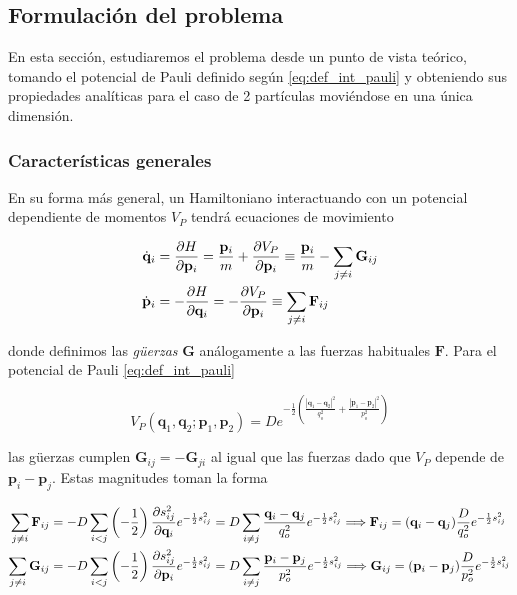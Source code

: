 \subsection{Formulación del problema}

En esta sección, estudiaremos el problema desde un punto de vista teórico, tomando el potencial de Pauli definido según \eqref{eq:def_int_pauli} y obteniendo sus propiedades analíticas para el caso de 2 partículas moviéndose en una única dimensión.

\subsubsection{Características generales}

En su forma más general, un Hamiltoniano interactuando con un potencial dependiente de momentos $V_P$ tendrá ecuaciones de movimiento

\begin{align*}
\dot{\mathbf{q}}_i &= \frac{\partial H}{\partial\mathbf{p}_i} = \frac{\mathbf{p}_i}{m} + \frac{\partial V_P}{\partial\mathbf{p}_i} \equiv \frac{\mathbf{p}_i}{m} - \sum_{j\neq i} \mathbf{G}_{ij} \\
\dot{\mathbf{p}}_i &= -\frac{\partial H}{\partial\mathbf{q}_i} = -\frac{\partial V_P}{\partial\mathbf{p}_i} \equiv \sum_{j\neq i} \mathbf{F}_{ij}
\end{align*}

donde definimos las \textit{güerzas} $\mathbf{G}$ análogamente a las fuerzas habituales $\mathbf{F}$.
Para el potencial de Pauli \eqref{eq:def_int_pauli}

\[ V_P(\mathbf{q}_1,\mathbf{q}_2;\mathbf{p}_1,\mathbf{p}_2) = De^{-\frac{1}{2}\left( \frac{|\mathbf{q}_1-\mathbf{q}_2|^2}{q_o^2} +\frac{|\mathbf{p}_1-\mathbf{p}_2|^2}{p_o^2} \right)} \]

las güerzas cumplen $\mathbf{G}_{ij} = -\mathbf{G}_{ji}$ al igual que las fuerzas dado que $V_P$ depende de $\mathbf{p}_i - \mathbf{p}_j$. Estas magnitudes toman la forma

\begin{align*}
\sum_{j\neq i} \mathbf{F}_{ij} &= -D \sum_{i<j} \left(-\frac{1}{2}\right)\frac{\partial s_{ij}^2}{\partial\mathbf{q}_i}e^{-\frac{1}{2}s_{ij}^2} = D \sum_{i\neq j} \frac{\mathbf{q}_i - \mathbf{q}_j}{q_o^2}e^{-\frac{1}{2}s_{ij}^2} \Longrightarrow \mathbf{F}_{ij} = (\mathbf{q}_i - \mathbf{q}_j)\frac{D}{q_o^2}e^{-\frac{1}{2}s_{ij}^2} \\
\sum_{j\neq i} \mathbf{G}_{ij} &= -D \sum_{i<j} \left(-\frac{1}{2}\right)\frac{\partial s_{ij}^2}{\partial\mathbf{p}_i}e^{-\frac{1}{2}s_{ij}^2} = D \sum_{i\neq j} \frac{\mathbf{p}_i - \mathbf{p}_j}{p_o^2}e^{-\frac{1}{2}s_{ij}^2} \Longrightarrow \mathbf{G}_{ij} = (\mathbf{p}_i - \mathbf{p}_j)\frac{D}{p_o^2}e^{-\frac{1}{2}s_{ij}^2}
\end{align*}

